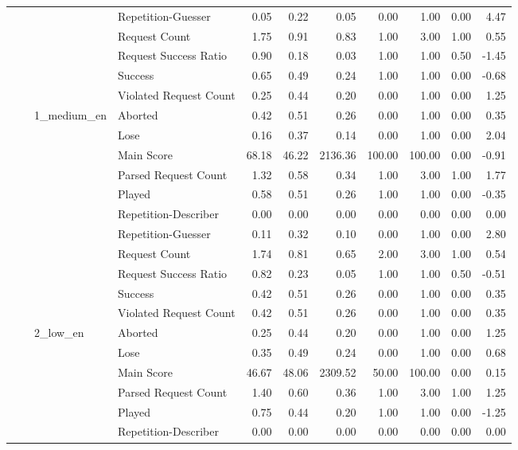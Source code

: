 \begin{tabular}{llllrrrrrrr}
 &  &  & Repetition-Guesser & 0.05 & 0.22 & 0.05 & 0.00 & 1.00 & 0.00 & 4.47 \\
 &  &  & Request Count & 1.75 & 0.91 & 0.83 & 1.00 & 3.00 & 1.00 & 0.55 \\
 &  &  & Request Success Ratio & 0.90 & 0.18 & 0.03 & 1.00 & 1.00 & 0.50 & -1.45 \\
 &  &  & Success & 0.65 & 0.49 & 0.24 & 1.00 & 1.00 & 0.00 & -0.68 \\
 &  &  & Violated Request Count & 0.25 & 0.44 & 0.20 & 0.00 & 1.00 & 0.00 & 1.25 \\
\cline{3-11}
 &  & \multirow[t]{11}{*}{1_medium_en} & Aborted & 0.42 & 0.51 & 0.26 & 0.00 & 1.00 & 0.00 & 0.35 \\
 &  &  & Lose & 0.16 & 0.37 & 0.14 & 0.00 & 1.00 & 0.00 & 2.04 \\
 &  &  & Main Score & 68.18 & 46.22 & 2136.36 & 100.00 & 100.00 & 0.00 & -0.91 \\
 &  &  & Parsed Request Count & 1.32 & 0.58 & 0.34 & 1.00 & 3.00 & 1.00 & 1.77 \\
 &  &  & Played & 0.58 & 0.51 & 0.26 & 1.00 & 1.00 & 0.00 & -0.35 \\
 &  &  & Repetition-Describer & 0.00 & 0.00 & 0.00 & 0.00 & 0.00 & 0.00 & 0.00 \\
 &  &  & Repetition-Guesser & 0.11 & 0.32 & 0.10 & 0.00 & 1.00 & 0.00 & 2.80 \\
 &  &  & Request Count & 1.74 & 0.81 & 0.65 & 2.00 & 3.00 & 1.00 & 0.54 \\
 &  &  & Request Success Ratio & 0.82 & 0.23 & 0.05 & 1.00 & 1.00 & 0.50 & -0.51 \\
 &  &  & Success & 0.42 & 0.51 & 0.26 & 0.00 & 1.00 & 0.00 & 0.35 \\
 &  &  & Violated Request Count & 0.42 & 0.51 & 0.26 & 0.00 & 1.00 & 0.00 & 0.35 \\
\cline{3-11}
 &  & \multirow[t]{11}{*}{2_low_en} & Aborted & 0.25 & 0.44 & 0.20 & 0.00 & 1.00 & 0.00 & 1.25 \\
 &  &  & Lose & 0.35 & 0.49 & 0.24 & 0.00 & 1.00 & 0.00 & 0.68 \\
 &  &  & Main Score & 46.67 & 48.06 & 2309.52 & 50.00 & 100.00 & 0.00 & 0.15 \\
 &  &  & Parsed Request Count & 1.40 & 0.60 & 0.36 & 1.00 & 3.00 & 1.00 & 1.25 \\
 &  &  & Played & 0.75 & 0.44 & 0.20 & 1.00 & 1.00 & 0.00 & -1.25 \\
 &  &  & Repetition-Describer & 0.00 & 0.00 & 0.00 & 0.00 & 0.00 & 0.00 & 0.00 \\

\end{tabular}
